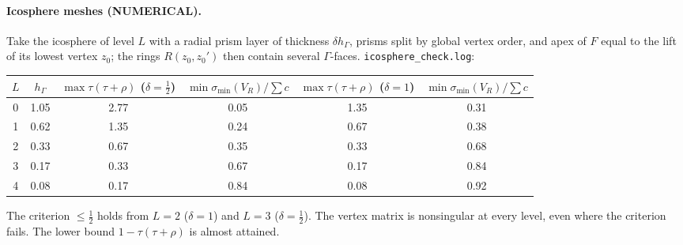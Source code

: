 \documentclass[11pt]{article}
\theoremstyle{definition}
\newcommand{\hG}{h_\Gamma}
\begin{document}
\paragraph{Icosphere meshes (NUMERICAL).} Take the icosphere of level $L$ with a radial prism layer of thickness $\delta\hG$, prisms split by global vertex order, and apex of $F$ equal to the lift of its lowest vertex $z_0$; the rings $R(z_0,z_0')$ then contain several $\Gamma$-faces. \texttt{icosphere\_check.log}:
\begin{center}\small
\begin{tabular}{cccccc}
\toprule
$L$ & $\hG$ & $\max\tau(\tau+\rho)$ ($\delta=\frac12$) & $\min\sigma_{\min}(V_R)/\sum c$ & $\max\tau(\tau+\rho)$ ($\delta=1$) & $\min\sigma_{\min}(V_R)/\sum c$\\
\midrule
0&1.05&2.77&0.05&1.35&0.31\\
1&0.62&1.35&0.24&0.67&0.38\\
2&0.33&0.67&0.35&0.33&0.68\\
3&0.17&0.33&0.67&0.17&0.84\\
4&0.08&0.17&0.84&0.08&0.92\\
\bottomrule
\end{tabular}
\end{center}
The criterion $\le\frac12$ holds from $L=2$ ($\delta=1$) and $L=3$ ($\delta=\frac12$). The vertex matrix is nonsingular at every level, even where the criterion fails. The lower bound $1-\tau(\tau+\rho)$ is almost attained.

\end{document}

